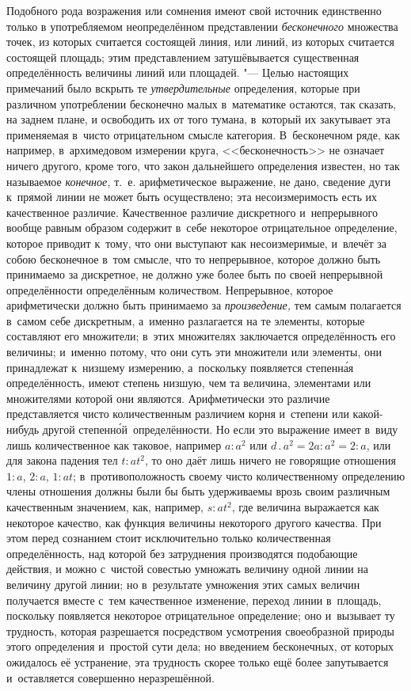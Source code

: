 Подобного рода возражения или сомнения имеют свой источник единственно только в
употребляемом неопределённом представлении {\em бесконечного} множества точек,
из которых считается состоящей линия, или линий, из которых считается состоящей
площадь; этим представлением затушёвывается существенная определённость
величины линий или площадей. "--- Целью настоящих примечаний было вскрыть те
{\em утвердительные} определения, которые при различном употреблении
бесконечно малых в~математике остаются, так сказать, на заднем плане, и
освободить их от того тумана, в~который их закутывает эта применяемая в~чисто
отрицательном смысле категория. В~бесконечном ряде, как например, в~архимедовом
измерении круга, <<бесконечность>> не означает ничего другого, кроме того, что
закон дальнейшего определения известен, но так называемое {\em конечное,} т.~е.
арифметическое выражение, не дано, сведение дуги к~прямой линии не может быть
осуществлено; эта несоизмеримость есть их качественное различие. Качественное
различие дискретного и~непрерывного вообще равным образом содержит в~себе
некоторое отрицательное определение, которое приводит к~тому, что они выступают
как несоизмеримые, и~влечёт за собою бесконечное в~том смысле, что то
непрерывное, которое должно быть принимаемо за дискретное, не должно уже более
быть по своей непрерывной определённости определённым количеством. Непрерывное,
которое арифметически должно быть принимаемо за {\em произведение,} тем самым
полагается в~самом себе дискретным, а~именно разлагается на те элементы,
которые составляют его множители; в~этих множителях заключается определённость
его величины; и~именно потому, что они суть эти множители или элементы, они
принадлежат к~низшему измерению, а~поскольку появляется степенн\'{а}я
определённость, имеют степень низшую, чем та величина, элементами или
множителями которой они являются. Арифметически это различие представляется
чисто количественным различием корня и~степени или какой-нибудь другой
степенн\'{о}й~определённости. Но если это выражение имеет в~виду лишь
количественное как таковое, например $a:a^2$ или $d\,.\,a^2=2a:a^2=2:a$, или
для закона падения тел $t:at^2$, то оно даёт лишь ничего не говорящие отношения
$1:a$, $2:a$, $1:at$; в~противоположность своему чисто количественному
определению члены отношения должны были бы быть удерживаемы врозь своим
различным качественным значением, как, например, $s:at^2$, где величина
выражается как некоторое качество, как функция величины некоторого другого
качества. При этом перед сознанием стоит исключительно только количественная
определённость, над которой без затруднения производятся подобающие действия,
и можно с~чистой совестью умножать величину одной линии на величину другой
линии; но в~результате умножения этих самых величин получается вместе с~тем
качественное изменение, переход линии в~площадь, поскольку появляется некоторое
отрицательное определение; оно и~вызывает ту трудность, которая разрешается
посредством усмотрения своеобразной природы этого определения и~простой сути
дела; но введением бесконечных, от которых ожидалось её устранение, эта
трудность скорее только ещё более запутывается и~оставляется совершенно
неразрешённой.
